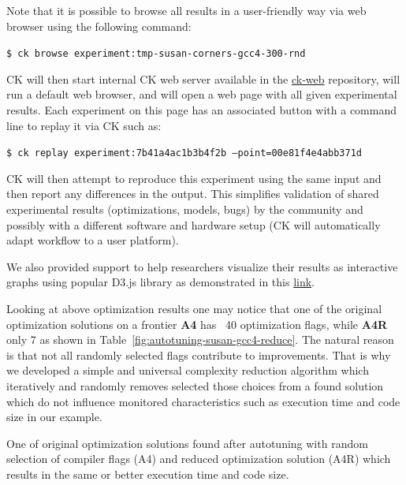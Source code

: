 Note that it is possible to browse all results in a user-friendly way 
via web browser using the following command:

\begin{flushleft}
\texttt{\$ ck browse experiment:tmp-susan-corners-gcc4-300-rnd}
\end{flushleft}

CK will then start internal CK web server 
available in the \href{https://github.com/ctuning/ck-web}{ck-web}
repository, will run a default web browser, and will 
open a web page with all given experimental results.
%
Each experiment on this page has an associated button 
with a command line to replay it via CK such as:                          

\begin{flushleft}
\texttt{\$ ck replay experiment:7b41a4ac1b3b4f2b --point=00e81f4e4abb371d}
\end{flushleft}

CK will then attempt to reproduce this experiment using the same input
and then report any differences in the output.
%
This simplifies validation of shared experimental results 
(optimizations, models, bugs) by the community
and possibly with a different software and hardware setup
(CK will automatically adapt workflow to a user platform).

We also provided support to help researchers 
visualize their results as interactive graphs 
using popular D3.js library as demonstrated in this 
\href{http://cknowledge.org/repo/web.php?wcid=graph:6b6d77a51c74ec1a&subgraph=rpi3-autotuning-susan-gcc4-interactive}{link}.

Looking at above optimization results one may notice 
that one of the original optimization solutions on a frontier \textbf{A4} 
has ~40 optimization flags, while \textbf{A4R} only 7 as shown in Table~\ref{fig:autotuning-susan-gcc4-reduce}.
%
The natural reason is that not all randomly selected flags contribute to improvements.
%
That is why we developed a simple and universal complexity reduction algorithm
which iteratively and randomly removes selected those choices from a found solution 
which do not influence monitored characteristics such as execution time and code size
in our example.

  \begin{table}[]
    \centering
    \caption{
      One of original optimization solutions found after autotuning with random selection of compiler flags (A4) 
      and reduced optimization solution (A4R) which results in the same or better execution time and code size.
    }
    \label{fig:autotuning-susan-gcc4-reduce}
  \end{table}


